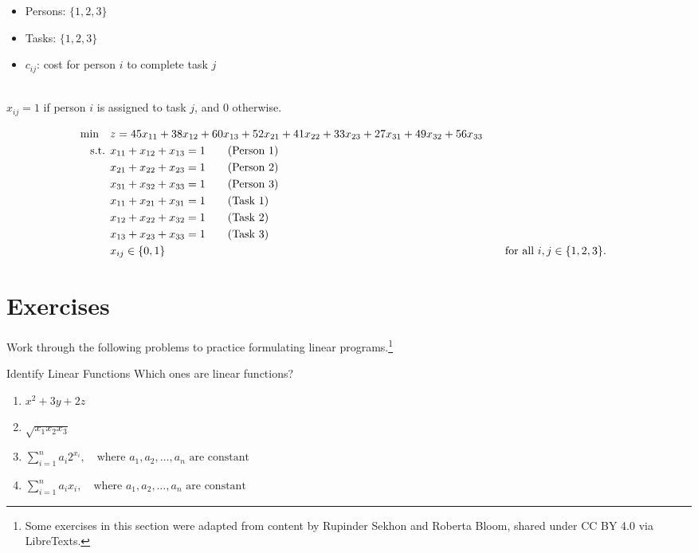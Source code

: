 \begin{solution}

\smallskip {}
\begin{itemize}
\item Persons: $\{1, 2, 3\}$
\item Tasks: $\{1, 2, 3\}$
\end{itemize}

\smallskip {}
\begin{itemize}
\item $c_{ij}$: cost for person $i$ to complete task $j$
\end{itemize}

\smallskip {} \\
$x_{ij} = 1$ if person $i$ is assigned to task $j$, and $0$ otherwise.

\smallskip {}
\begin{align*}
\min \quad & z = 45x_{11} + 38x_{12} + 60x_{13} + 52x_{21} + 41x_{22} + 33x_{23} + 27x_{31} + 49x_{32} + 56x_{33} \\
\mbox{ s.t. }        & x_{11} + x_{12} + x_{13} = 1   \tag{Person 1} \\
& x_{21} + x_{22} + x_{23} = 1   \tag{Person 2} \\
& x_{31} + x_{32} + x_{33} = 1   \tag{Person 3} \\
& x_{11} + x_{21} + x_{31} = 1   \tag{Task 1} \\
& x_{12} + x_{22} + x_{32} = 1   \tag{Task 2} \\
& x_{13} + x_{23} + x_{33} = 1   \tag{Task 3} \\
& x_{ij} \in \{0, 1\} &&\quad \mbox{for all } i, j \in \{1, 2, 3\}.
\end{align*}
\end{solution}

\section{Exercises}

Work through the following problems to practice formulating linear programs.\footnote{Some exercises in this section were adapted from content by Rupinder Sekhon and Roberta Bloom, shared under CC BY 4.0 via LibreTexts.}


\begin{ex}{Identify Linear Functions}{}
 Which ones are linear functions?
\begin{enumerate}
    \item $x^2 + 3y + 2z$
    \item $\sqrt{x_1 x_2 x_3}$
    \item $\sum_{i=1}^n a_i 2^{x_i}, \quad \text{where } a_1, a_2, \dots, a_n \text{ are constant}$
    \item $\sum_{i=1}^n a_i x_i, \quad \text{where } a_1, a_2, \dots, a_n \text{ are constant}$
\end{enumerate}
\end{ex}

